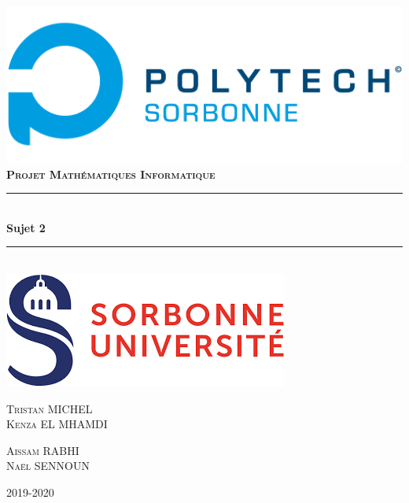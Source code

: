 \documentclass{article}
\newcommand{\HRule}{\rule{\linewidth}{0.5mm}}
\begin{document}

\begin{titlepage}
    \begin{sffamily}
        \begin{center}
            \includegraphics[scale=0.2]{../img/Logo_Polytech_Sorbonne.png}\\[1.5cm]
            \textsc{\Large \bfseries{Projet Mathématiques Informatique}}\\[1.5cm]
            \HRule \\[0.4cm]
            { \huge \bfseries Sujet 2\\[0.4cm]}
            \HRule \\[2cm]
            \includegraphics[scale=0.4]{../img/su.png}\\[2cm]
            \begin{minipage}{0.4\textwidth}
                \begin{flushleft} \large
                    \textsc{Tristan MICHEL\\ Kenza EL MHAMDI }
                \end{flushleft}
            \end{minipage}
            \begin{minipage}{0.4\textwidth}
                \begin{flushright} \large
                    \textsc{Aissam RABHI\\ Naël SENNOUN}
                \end{flushright}
            \end{minipage}
            \vfill
        
            {\large 2019-2020}
            
        \end{center}
    \end{sffamily}
\end{titlepage}
\end{document}
